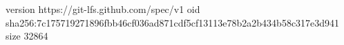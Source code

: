 version https://git-lfs.github.com/spec/v1
oid sha256:7c175719271896fbb46cf036ad871cdf5cf13113e78b2a2b434b58c317e3d941
size 32864

